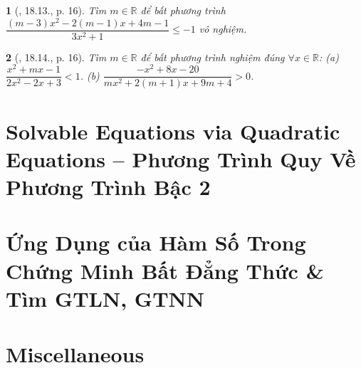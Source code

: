 \documentclass{article}
\newtheorem{baitoan}{}
\begin{document}
\begin{baitoan}[\cite{Hai_Hung_Thu_Tung_ncpt_Toan_10_tap_2}, 18.13., p. 16]
	Tìm $m\in\mathbb{R}$ để bất phương trình $\dfrac{(m - 3)x^2 - 2(m - 1)x + 4m - 1}{3x^2 + 1}\le-1$ vô nghiệm.
\end{baitoan}

\begin{baitoan}[\cite{Hai_Hung_Thu_Tung_ncpt_Toan_10_tap_2}, 18.14., p. 16]
	Tìm $m\in\mathbb{R}$ để bất phương trình nghiệm đúng $\forall x\in\mathbb{R}$: (a) $\dfrac{x^2 + mx - 1}{2x^2 - 2x + 3} < 1$. (b) $\dfrac{-x^2 + 8x - 20}{mx^2 + 2(m + 1)x + 9m + 4} > 0$.
\end{baitoan}


\section{Solvable Equations via Quadratic Equations -- Phương Trình Quy Về Phương Trình Bậc 2}


\section{Ứng Dụng của Hàm Số Trong Chứng Minh Bất Đẳng Thức \& Tìm GTLN, GTNN}


\section{Miscellaneous}


\printbibliography[heading=bibintoc]
	
\end{document}
